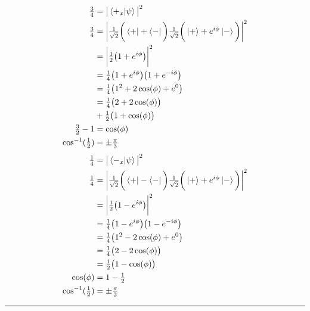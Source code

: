 \documentclass[paper=a4, fontsize=11pt]{scrartcl} %
\numberwithin{equation}{section} %
\numberwithin{figure}{section} %
\numberwithin{table}{section} %
\newcommand{\horrule}[1]{\rule{\linewidth}{#1}} %
\begin{document}
\begin{multicols}{2}
\noindent
\begin{align*}
\tfrac{3}{4} & = \big | \braket{+_x| \psi}  \big |^2 \\
\tfrac{3}{4} & = \bigg |  \tfrac{1}{\sqrt{2}} \bigg ( \bra{+} + \bra{-} \bigg ) \tfrac{1}{\sqrt{2}} \bigg ( \ket{+}  + e^{i\phi}\ket{-} \bigg )  \bigg |^2 \\
& = \bigg | \tfrac{1}{2} \big ( 1 + e^{i\phi}  \big )  \bigg|^2 \\
& = \tfrac{1}{4} \big ( 1 + e^{i\phi}  \big ) \big ( 1 + e^{-i\phi}   \big ) \\
& = \tfrac{1}{4} \big (  1^2 + 2\cos(\phi) + e^0 \big ) \\
& = \tfrac{1}{4} \big ( 2 + 2\cos(\phi) \big ) \\
& + \tfrac{1}{2} \big (  1 + \cos(\phi) \big ) \\
\tfrac{3}{2} - 1 & = \cos(\phi) \\
\cos^{-1}(\tfrac{1}{2}) &= \pm \tfrac{\pi}{3}
\end{align*}
\begin{align*}
\tfrac{1}{4} & = \big | \braket{-_x| \psi}  \big |^2 \\
\tfrac{1}{4} & = \bigg |  \tfrac{1}{\sqrt{2}} \bigg ( \bra{+} - \bra{-} \bigg ) \tfrac{1}{\sqrt{2}} \bigg ( \ket{+}  + e^{i\phi}\ket{-} \bigg )  \bigg |^2 \\
& = \bigg | \tfrac{1}{2} \big ( 1 - e^{i\phi}  \big )  \bigg|^2 \\
& = \tfrac{1}{4} \big ( 1 - e^{i\phi}  \big ) \big ( 1 - e^{-i\phi}   \big ) \\
& = \tfrac{1}{4} \big (  1^2 - 2\cos(\phi) + e^0 \big ) \\
& = \tfrac{1}{4} \big ( 2 - 2\cos(\phi) \big ) \\
& = \tfrac{1}{2} \big (  1 - \cos(\phi) \big ) \\
\cos(\phi) & = 1- \tfrac{1}{2}  \\
\cos^{-1}(\tfrac{1}{2}) & =  \pm \tfrac{\pi}{3}
\end{align*}
\end{multicols}
\horrule{2pt}
\end{document}
